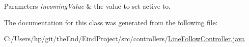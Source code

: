 \begin{DoxyParams}{Parameters}
{\em incoming\-Value} & the value to set active to. \\
\hline
\end{DoxyParams}


The documentation for this class was generated from the following file\-:\begin{DoxyCompactItemize}
\item 
C\-:/\-Users/hp/git/the\-End/\-Eind\-Project/src/controllers/\hyperlink{_line_follow_controller_8java}{Line\-Follow\-Controller.\-java}\end{DoxyCompactItemize}

